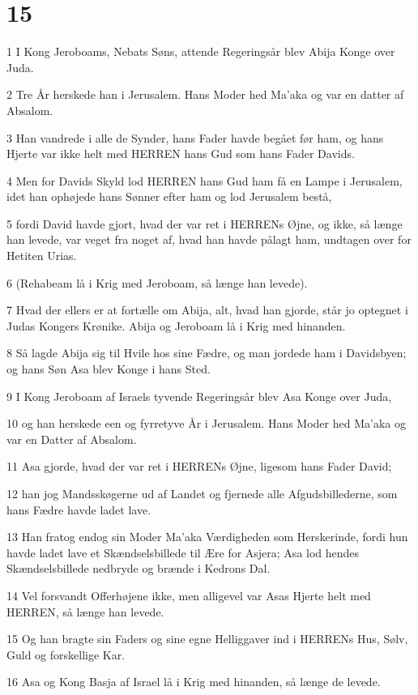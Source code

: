 \chapter{15}

\par 1 I Kong Jeroboams, Nebats Søns, attende Regeringsår blev Abija Konge over Juda.
\par 2 Tre År herskede han i Jerusalem. Hans Moder hed Ma'aka og var en datter af Absalom.
\par 3 Han vandrede i alle de Synder, hans Fader havde begået før ham, og hans Hjerte var ikke helt med HERREN hans Gud som hans Fader Davids.
\par 4 Men for Davids Skyld lod HERREN hans Gud ham få en Lampe i Jerusalem, idet han ophøjede hans Sønner efter ham og lod Jerusalem bestå,
\par 5 fordi David havde gjort, hvad der var ret i HERRENs Øjne, og ikke, så længe han levede, var veget fra noget af, hvad han havde pålagt ham, undtagen over for Hetiten Urias.
\par 6 (Rehabeam lå i Krig med Jeroboam, så længe han levede).
\par 7 Hvad der ellers er at fortælle om Abija, alt, hvad han gjorde, står jo optegnet i Judas Kongers Krønike. Abija og Jeroboam lå i Krig med hinanden.
\par 8 Så lagde Abija sig til Hvile hos sine Fædre, og man jordede ham i Davidsbyen; og hans Søn Asa blev Konge i hans Sted.
\par 9 I Kong Jeroboam af Israels tyvende Regeringsår blev Asa Konge over Juda,
\par 10 og han herskede een og fyrretyve År i Jerusalem. Hans Moder hed Ma'aka og var en Datter af Absalom.
\par 11 Asa gjorde, hvad der var ret i HERRENs Øjne, ligesom hans Fader David;
\par 12 han jog Mandsskøgerne ud af Landet og fjernede alle Afgudsbillederne, som hans Fædre havde ladet lave.
\par 13 Han fratog endog sin Moder Ma'aka Værdigheden som Herskerinde, fordi hun havde ladet lave et Skændselsbillede til Ære for Asjera; Asa lod hendes Skændselsbillede nedbryde og brænde i Kedrons Dal.
\par 14 Vel forsvandt Offerhøjene ikke, men alligevel var Asas Hjerte helt med HERREN, så længe han levede.
\par 15 Og han bragte sin Faders og sine egne Helliggaver ind i HERRENs Hus, Sølv, Guld og forskellige Kar.
\par 16 Asa og Kong Basja af Israel lå i Krig med hinanden, så længe de levede.
